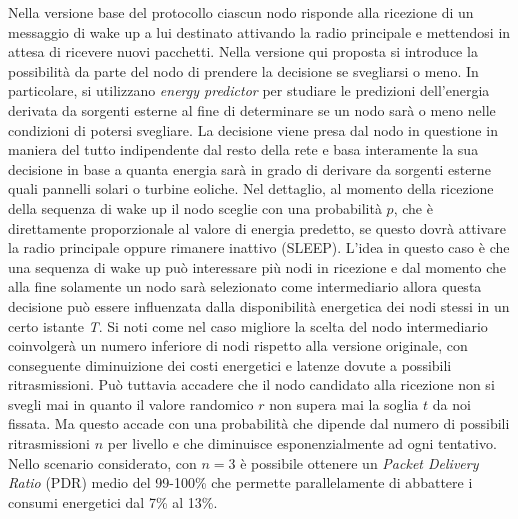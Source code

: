 \documentclass{report}
\begin{document}
Nella versione base del protocollo ciascun nodo risponde alla ricezione di un messaggio di wake up a lui destinato attivando la radio principale e mettendosi
in attesa di ricevere nuovi pacchetti. Nella versione qui proposta si introduce la possibilità da parte del nodo di prendere la decisione se svegliarsi o meno.
In particolare, si utilizzano \emph{energy predictor} per studiare le predizioni dell'energia derivata da sorgenti esterne al fine di determinare se un nodo sarà o
meno nelle condizioni di potersi svegliare. La decisione viene presa dal nodo in questione in maniera del tutto indipendente dal resto della rete e basa interamente
la sua decisione in base a quanta energia sarà in grado di derivare da sorgenti esterne quali pannelli solari o turbine eoliche. Nel dettaglio, al momento
della ricezione della sequenza di wake up il nodo sceglie con una probabilità $p$, che è direttamente proporzionale al valore di energia predetto,
se questo dovrà attivare la radio principale oppure rimanere inattivo (SLEEP). L'idea in questo caso è che una sequenza di wake up può interessare più nodi
in ricezione e dal momento che alla fine solamente un nodo sarà selezionato come intermediario allora questa decisione può essere influenzata dalla
disponibilità energetica dei nodi stessi in un certo istante \emph{T}. Si noti come nel caso migliore la scelta del nodo intermediario coinvolgerà un numero
inferiore di nodi rispetto alla versione originale, con conseguente diminuizione dei costi energetici e latenze dovute a possibili ritrasmissioni.
Può tuttavia accadere che il nodo candidato alla ricezione non si svegli mai in quanto il valore randomico $r$ non supera mai la soglia $t$ da noi fissata.
Ma questo accade con una probabilità che dipende dal numero di possibili ritrasmissioni $n$ per livello e che diminuisce esponenzialmente ad ogni tentativo.
Nello scenario considerato, con $n=3$ è possibile ottenere un \emph{Packet Delivery Ratio} (PDR) medio del 99-100\% che permette parallelamente di abbattere i
consumi energetici dal 7\% al 13\%.\\
\end{document}
